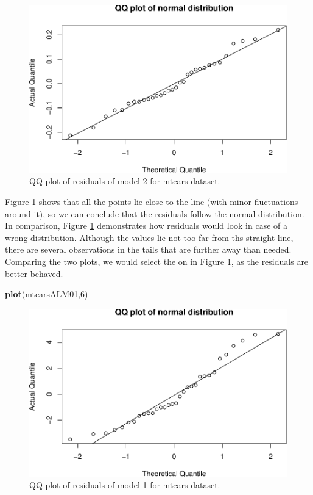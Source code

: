 \documentclass[
]{book}
\newenvironment{Shaded}{\begin{snugshade}}{\end{snugshade}}
\newcommand{\DecValTok}[1]{\textcolor[rgb]{0.00,0.00,0.81}{#1}}
\newcommand{\FunctionTok}[1]{\textcolor[rgb]{0.13,0.29,0.53}{\textbf{#1}}}
\newcommand{\NormalTok}[1]{#1}
\theoremstyle{definition}
\theoremstyle{definition}
\theoremstyle{definition}
\theoremstyle{definition}
\theoremstyle{remark}
\begin{document}
\begin{figure}
\centering
\includegraphics{Svetunkov---Statistics-for-Business-Analytics_files/figure-latex/diagnostics12-1.pdf}
\caption{\label{fig:diagnostics12}QQ-plot of residuals of model 2 for mtcars dataset.}
\end{figure}

Figure \ref{fig:diagnostics12} shows that all the points lie close to the line (with minor fluctuations around it), so we can conclude that the residuals follow the normal distribution. In comparison, Figure \ref{fig:diagnostics12} demonstrates how residuals would look in case of a wrong distribution. Although the values lie not too far from ths straight line, there are several observations in the tails that are further away than needed. Comparing the two plots, we would select the on in Figure \ref{fig:diagnostics12}, as the residuals are better behaved.

\begin{Shaded}
\begin{Highlighting}[]
\FunctionTok{plot}\NormalTok{(mtcarsALM01,}\DecValTok{6}\NormalTok{)}
\end{Highlighting}
\end{Shaded}

\begin{figure}
\centering
\includegraphics{Svetunkov---Statistics-for-Business-Analytics_files/figure-latex/diagnostics13-1.pdf}
\caption{\label{fig:diagnostics13}QQ-plot of residuals of model 1 for mtcars dataset.}
\end{figure}
\end{document}
